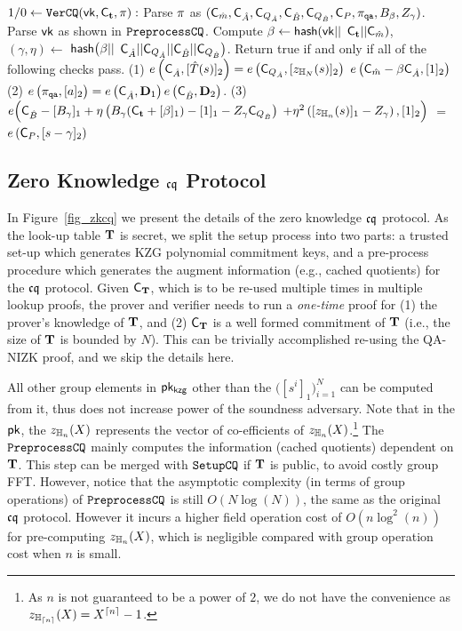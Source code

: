 \begin{footnotesize}
\begin{algorithm}[bt]
$1/0 \leftarrow \cqverify(\vk, 
	\Commit_{\myvec{t}}, \prf):$  \newline
Parse $\prf$ as $(\bm, \ba, \bqa, \bb, \bqb, \bp, \prfqa, B_\beta,Z_\gamma)$.
Parse $\vk$ as shown in $\cqpreproc$.
Compute $\beta \leftarrow \hash(\vk \concat$ $\bt \concat \bm)$,  
	$(\gamma, \eta) \leftarrow$ $\hash\big(\beta \concat$
		$\ba \concat	
		\bqa \concat	
		\bb \concat	
		\bqb\big)$.  
Return true if and only if all of the following checks pass. \newline
(1) $	
		e\left(\ba, [\hat{T}(s)]_2\right) = 
		e\left(\bqa, [z_\H(s)]_2\right) ~
		e\left(\bm - \beta \ba, [1]_2\right)
	$\newline	
(2) $e\left(\prfqa, [a]_2\right) = e\left(\ba,\myvec{D}_1\right) 
e\left(\bb, \myvec{D}_2\right)$. \newline
(3) $e\Big(\bb-[B_\gamma]_1+\eta \left(B_\gamma(\Commit_{\myvec{t}}+[\beta]_1) - [1]_1 - Z_\gamma\bqb\right)$ $+ \eta^2\left([z_\V(s)]_1-Z_\gamma\right), 
[1]_2\Big)$ $=$ $e\left(\bp, [s-\gamma]_2\right)$ \newline
\caption{Zero Knowledge $\cq$ Protocol}
\label{fig_zkcq}
\end{algorithm}
\end{footnotesize}


\subsection{Zero Knowledge $\cq$ Protocol}
In Figure\ \ref{fig_zkcq} we present the details
of the zero knowledge $\cq$ protocol.
As the look-up table $\myvec{T}$ is secret,
we split the setup process into two parts:
a trusted set-up which generates KZG polynomial
commitment keys, and a pre-process procedure
which generates the augment information (e.g., cached
quotients) for the $\cq$ protocol. Given 
$\Commit_{\myvec{T}}$, which is to be re-used
multiple times in multiple lookup proofs,
the prover and verifier needs to run a {\em one-time}
proof for (1) the prover's knowledge of $\myvec{T}$,
and (2) $\Commit_{\myvec{T}}$ is a well formed
commitment of $\myvec{T}$ (i.e., the size of
$\myvec{T}$ is bounded by $N$). This can be trivially
accomplished re-using the QA-NIZK proof, and we skip the details here.

All other group elements in
$\pkkzg$ other than the
$\big([s^i]_1\big)_{i=1}^N$
can be computed from it, thus does not increase
power of the soundness adversary.
Note that in the $\pk$, the $z_\V(X)$ represents the vector of
co-efficients of $z_\V(X)$.\footnote{As $n$ is not guaranteed
to be a power of $2$, we do not have the convenience
as $z_\Vtwo(X) = X^\n -1$.}
The $\cqpreproc$ mainly computes the information (cached quotients)
dependent on $\myvec{T}$. This step can be merged with
$\cqsetup$ if $\myvec{T}$ is public, to avoid costly
group FFT. However, notice that the asymptotic complexity (in terms
of group operations)
of $\cqpreproc$ is still $O(N\log(N))$, the same as the original
$\cq$ protocol. However it incurs a higher
field operation cost of $O(n\log^2(n))$ for
pre-computing $z_\V(X)$, which is negligible compared with group operation
cost when $n$ is small.


